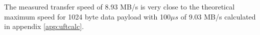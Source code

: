 The measured transfer speed of 8.93 MB/s is very close to the theoretical
maximum speed for 1024 byte data payload with 100$\mu s$ of 9.03 MB/s
calculated in appendix \ref{app:uftcalc}.



%
%
